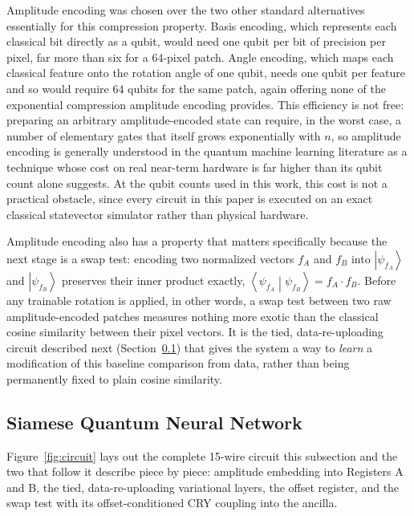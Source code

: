\documentclass[conference]{IEEEtran}
\newcommand{\ket}[1]{\left|#1\right\rangle}
\newcommand{\braket}[2]{\left\langle#1\middle|#2\right\rangle}
\begin{document}
Amplitude encoding was chosen over the two other standard alternatives essentially for this compression property. Basis encoding, which represents each classical bit directly as a qubit, would need one qubit per bit of precision per pixel, far more than six for a 64-pixel patch. Angle encoding, which maps each classical feature onto the rotation angle of one qubit, needs one qubit per feature and so would require 64 qubits for the same patch, again offering none of the exponential compression amplitude encoding provides. This efficiency is not free: preparing an arbitrary amplitude-encoded state can require, in the worst case, a number of elementary gates that itself grows exponentially with $n$, so amplitude encoding is generally understood in the quantum machine learning literature as a technique whose cost on real near-term hardware is far higher than its qubit count alone suggests. At the qubit counts used in this work, this cost is not a practical obstacle, since every circuit in this paper is executed on an exact classical statevector simulator rather than physical hardware.

Amplitude encoding also has a property that matters specifically because the next stage is a swap test: encoding two normalized vectors $f_A$ and $f_B$ into $\ket{\psi_{f_A}}$ and $\ket{\psi_{f_B}}$ preserves their inner product exactly, $\braket{\psi_{f_A}}{\psi_{f_B}} = f_A\cdot f_B$. Before any trainable rotation is applied, in other words, a swap test between two raw amplitude-encoded patches measures nothing more exotic than the classical cosine similarity between their pixel vectors. It is the tied, data-re-uploading circuit described next (Section~\ref{sec:siamese}) that gives the system a way to \emph{learn} a modification of this baseline comparison from data, rather than being permanently fixed to plain cosine similarity.

\subsection{Siamese Quantum Neural Network}\label{sec:siamese}
Figure~\ref{fig:circuit} lays out the complete 15-wire circuit this subsection and the two that follow it describe piece by piece: amplitude embedding into Registers A and B, the tied, data-re-uploading variational layers, the offset register, and the swap test with its offset-conditioned CRY coupling into the ancilla.
\end{document}
